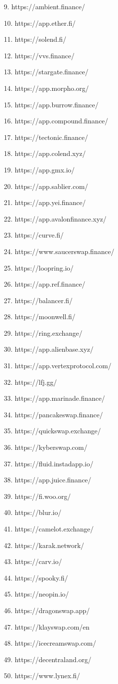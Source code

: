 \documentclass[conference]{IEEEtran}
\begin{document}
9. https://ambient.finance/

10. https://app.ether.fi/

11. https://solend.fi/

12. https://vvs.finance/

13. https://stargate.finance/

14. https://app.morpho.org/

15. https://app.burrow.finance/

16. https://app.compound.finance/

17. https://tectonic.finance/

18. https://app.colend.xyz/

19. https://app.gmx.io/

20. https://app.sablier.com/

21. https://app.yei.finance/

22. https://app.avalonfinance.xyz/

23. https://curve.fi/

24. https://www.saucerswap.finance/

25. https://loopring.io/

26. https://app.ref.finance/

27. https://balancer.fi/

28. https://moonwell.fi/

29. https://ring.exchange/

30. https://app.alienbase.xyz/

31. https://app.vertexprotocol.com/

32. https://lfj.gg/

33. https://app.marinade.finance/

34. https://pancakeswap.finance/

35. https://quickswap.exchange/

36. https://kyberswap.com/

37. https://fluid.instadapp.io/

38. https://app.juice.finance/

39. https://fi.woo.org/

40. https://blur.io/

41. https://camelot.exchange/

42. https://karak.network/

43. https://carv.io/

44. https://spooky.fi/

45. https://neopin.io/

46. https://dragonswap.app/

47. https://klayswap.com/en

48. https://icecreamswap.com/

49. https://decentraland.org/

50. https://www.lynex.fi/
\end{document}
